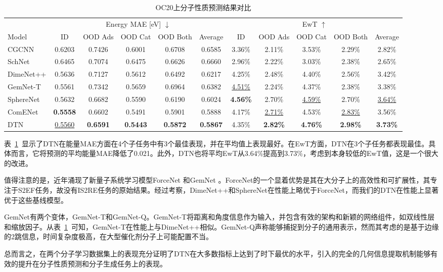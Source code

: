 \begin{table}[h]
    \begin{center}
    \caption{OC20上分子性质预测结果对比}
    \label{tab:reg_oc20}
    \resizebox{\textwidth}{!}
    {\begin{tabular}{l ccccc | ccccc  }
    \bottomrule
    &\multicolumn{5}{c|}{Energy MAE [eV] $\downarrow$} & \multicolumn{5}{c}{EwT $\uparrow$}  \\
    \cmidrule(l{4pt}r{4pt}){2-6}
    \cmidrule(l{4pt}r{4pt}){7-11}
    Model & ID &  OOD Ads & OOD Cat & OOD Both &Average& ID &  OOD Ads & OOD Cat & OOD Both &Average\\
    \midrule
    CGCNN 
    & 0.6203 & 0.7426 & 0.6001& 0.6708& 0.6585
    & 3.36\% & 2.11\% & 3.53\% & 2.29\% & 2.82\% \\
    SchNet
    & 0.6465 & 0.7074& 0.6475 & 0.6626& 0.6660
    & 2.96\% & 2.22\% &3.03\%& 2.38\% & 2.65\% \\
    DimeNet++
    & 0.5636 & 0.7127 & 0.5612& 0.6492& 0.6217
    & 4.25\% & 2.48\%& 4.40\%& 2.56\% & 3.42\%\\
    GemNet-T
    & 0.5561 & 0.7342 & 0.5659& 0.6964& 0.6382
    & \underline{4.51\%} & 2.24\%& 4.37\%& 2.38\% & 3.38\%\\
    SphereNet
    & 0.5632 & 0.6682 & 0.5590 & 0.6190 & 0.6024
    & \textbf{4.56\%} & 2.70\% & \underline{4.59\%} & 2.70\% & \underline{3.64\%} \\
    ComENet
    & \textbf{0.5558} & 0.6602 & 0.5491 & 0.5901 & 0.5888
    & 4.17\% & \underline{2.71\%} & 4.53\% & \underline{2.83\%} & 3.56\% \\
    DTN
    & \underline{0.5560} & \textbf{0.6591} & \textbf{0.5443} & \textbf{0.5872} & \textbf{0.5867}
    & 4.35\% & \textbf{2.82\%} & \textbf{4.76\%} & \textbf{2.98\%} & \textbf{3.73\%} \\
    \bottomrule
    \end{tabular}}
    \vspace{-10pt}
    \end{center}
\end{table}

表~\ref{tab:reg_oc20}~显示了DTN在能量MAE方面在4个子任务中有3个最佳表现，并在平均值上表现最好。在EwT方面，DTN在3个子任务都表现最佳。具体而言，它将预测的平均能量MAE降低了0.021。此外，DTN也将平均EwT从3.64\%提高到3.73\%，考虑到本身较低的EwT值，这是一个很大的改进。

值得注意的是，近年涌现了新量子系统学习模型ForceNet \cite{forcenet_hu_21} 和GemNet \cite{gemnet_gasteiger_21}。ForceNet的一个显着优势是其在大分子上的高效性和可扩展性，其专注于S2EF任务，故没有IS2RE任务的原始结果。经过考察，DimeNet++和SphereNet在性能上略优于ForceNet，而我们的DTN在性能上显著优于这些基线模型。

GemNet有两个变体，GemNet-T和GemNet-Q。GemNet-T将距离和角度信息作为输入，并包含有效的架构和新颖的网络组件，如双线性层和缩放因子。从表~\ref{tab:reg_oc20}~可知，GemNet-T在性能上与DimeNet++相似。GemNet-Q声称能够捕捉到分子的通用表示，然而其考虑的是基于边缘的2跳信息，时间复杂度极高，在大型催化剂分子上可能配置不当。

总而言之，在两个分子学习数据集上的表现充分证明了DTN在大多数指标上达到了时下最优的水平，引入的完全的几何信息提取机制能够有效的提升在分子性质预测和分子生成任务上的表现。